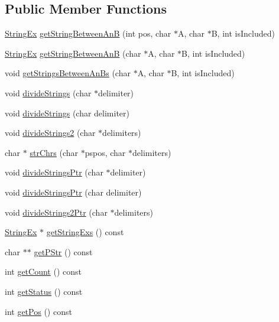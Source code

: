 \subsection*{Public Member Functions}
\begin{CompactItemize}
\item 
\hyperlink{classStringEx}{StringEx} \hyperlink{classText_94ffb3fc0b16c0404415b16e9f29c0aa}{getStringBetweenAnB} (int pos, char $\ast$A, char $\ast$B, int isIncluded)
\item 
\hyperlink{classStringEx}{StringEx} \hyperlink{classText_b23de14f2e2378e8c3c6c73d9ae28eef}{getStringBetweenAnB} (char $\ast$A, char $\ast$B, int isIncluded)
\item 
void \hyperlink{classText_c1b92f62e2178448e32dd96a08100c94}{getStringsBetweenAnBs} (char $\ast$A, char $\ast$B, int isIncluded)
\item 
void \hyperlink{classText_20e3bcacb767a6a20bf9b727b6333cc5}{divideStrings} (char $\ast$delimiter)
\item 
void \hyperlink{classText_fe6e02880ca0687b7706dec9641b802c}{divideStrings} (char delimiter)
\item 
void \hyperlink{classText_7ab326bd81ec7440aac9427b6991ab8b}{divideStrings2} (char $\ast$delimiters)
\item 
char $\ast$ \hyperlink{classText_e14ba07e81e2f56fd571e5743fb5c926}{strChrs} (char $\ast$pspos, char $\ast$delimiters)
\item 
void \hyperlink{classText_218720737506b3278d080ba4198d0f86}{divideStringsPtr} (char $\ast$delimiter)
\item 
void \hyperlink{classText_f9b3e13192f2c151cb47ca6522f8bb26}{divideStringsPtr} (char delimiter)
\item 
void \hyperlink{classText_b7ef1700c05efefe44eda7961d06f017}{divideStrings2Ptr} (char $\ast$delimiters)
\item 
\hyperlink{classStringEx}{StringEx} $\ast$ \hyperlink{classText_b5914b3a33faf887c6a734cad528cc55}{getStringExs} () const 
\item 
char $\ast$$\ast$ \hyperlink{classText_a5ccfe846fc0a6976000feebc3775db9}{getPStr} () const 
\item 
int \hyperlink{classText_677230c4f58f15cff7b014a91492e10b}{getCount} () const 
\item 
int \hyperlink{classText_32420d62ad10114b5cb5bdff866ee48d}{getStatus} () const 
\item 
int \hyperlink{classText_c9e2de51189a6f09f2cbd70c240dd112}{getPos} () const 
\item 
$$
\end{CompactItemize}
